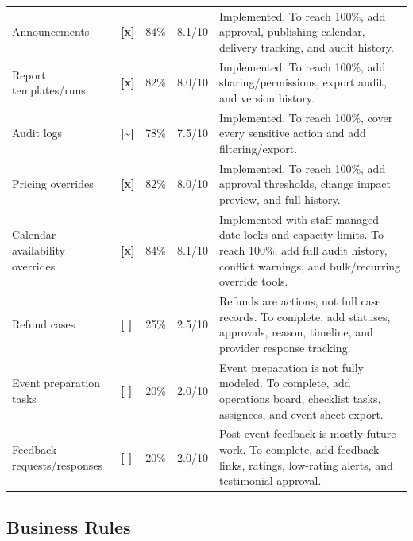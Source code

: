 \documentclass[11pt,a4paper]{article}
\newcommand{\statusdone}{\textbf{[x]}}
\newcommand{\statuspartial}{\textbf{[{\textasciitilde}]}}
\newcommand{\statusmissing}{\textbf{[ ]}}
\begin{document}
\begin{longtable}{L{0.24\textwidth} C{0.08\textwidth} C{0.10\textwidth} C{0.10\textwidth} L{0.36\textwidth}}
Announcements & \statusdone & 84\% & 8.1/10 & Implemented. To reach 100\%, add approval, publishing calendar, delivery tracking, and audit history. \\
Report templates/runs & \statusdone & 82\% & 8.0/10 & Implemented. To reach 100\%, add sharing/permissions, export audit, and version history. \\
Audit logs & \statuspartial & 78\% & 7.5/10 & Implemented. To reach 100\%, cover every sensitive action and add filtering/export. \\
Pricing overrides & \statusdone & 82\% & 8.0/10 & Implemented. To reach 100\%, add approval thresholds, change impact preview, and full history. \\
Calendar availability overrides & \statusdone & 84\% & 8.1/10 & Implemented with staff-managed date locks and capacity limits. To reach 100\%, add full audit history, conflict warnings, and bulk/recurring override tools. \\
Refund cases & \statusmissing & 25\% & 2.5/10 & Refunds are actions, not full case records. To complete, add statuses, approvals, reason, timeline, and provider response tracking. \\
Event preparation tasks & \statusmissing & 20\% & 2.0/10 & Event preparation is not fully modeled. To complete, add operations board, checklist tasks, assignees, and event sheet export. \\
Feedback requests/responses & \statusmissing & 20\% & 2.0/10 & Post-event feedback is mostly future work. To complete, add feedback links, ratings, low-rating alerts, and testimonial approval. \\
\bottomrule
\end{longtable}

\subsection{Business Rules}
\end{document}
